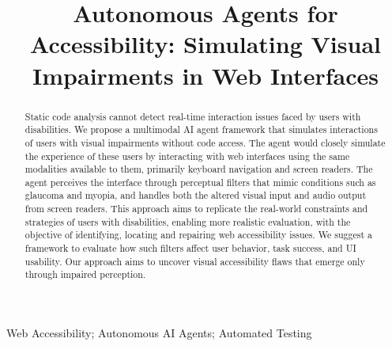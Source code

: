 \documentclass[10pt, conference]{IEEEtran}
\begin{document}
\title{Autonomous Agents for Accessibility: Simulating Visual Impairments in Web Interfaces}

\author{
\and
{}
}

\maketitle

\begin{abstract}
Static code analysis cannot detect real-time interaction issues faced by users with disabilities. We propose a multimodal \ac{AI} agent framework that simulates interactions of users with visual impairments without code access. 
The agent would closely simulate the experience of these users by interacting with web interfaces using the same modalities available to them, primarily keyboard navigation and screen readers. The agent perceives the interface through perceptual filters that mimic conditions such as glaucoma and myopia, and handles both the altered visual input and audio output from screen readers. This approach aims to replicate the real-world constraints and strategies of users with disabilities, enabling more realistic evaluation, with the objective of identifying, locating and repairing web accessibility issues.
We suggest a framework to evaluate how such filters affect user behavior, task success, and \ac{UI} usability. Our approach aims to uncover visual accessibility flaws that emerge only through impaired perception. 
\end{abstract}

\begin{IEEEkeywords}
Web Accessibility; Autonomous \ac{AI} Agents; Automated Testing
\end{IEEEkeywords}









\balance


\end{document}
